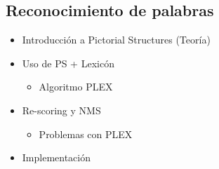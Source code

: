\subsection{Reconocimiento de palabras}
	\begin{itemize}
		\item Introducción a Pictorial Structures (Teoría)
		\item Uso de PS + Lexicón
		\begin{itemize}
			\item Algoritmo PLEX
		\end{itemize}
		\item Re-scoring y NMS
		\begin{itemize}
			\item Problemas con PLEX
		\end{itemize}
		\item Implementación
	\end{itemize}